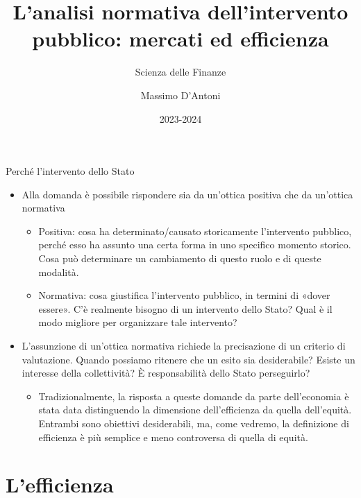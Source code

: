 \documentclass[aspectratio=149,11pt]{beamer}
\institute{Università di Siena}
\author{Massimo D'Antoni}
\date{2023-2024}
\title{L'analisi normativa dell'intervento pubblico: mercati ed efficienza}
\subtitle{Scienza delle Finanze}
\begin{document}
\maketitle

\begin{frame}{Perché l'intervento dello Stato}
\begin{itemize}
\item Alla domanda è possibile rispondere sia da un’ottica positiva che da un’ottica normativa
\begin{itemize}
\item \alert{Positiva}: cosa ha determinato/causato storicamente l’intervento pubblico, perché esso ha assunto una certa forma in uno specifico momento storico. Cosa può determinare un cambiamento di questo ruolo e di queste modalità.
\item \alert{Normativa}: cosa giustifica l’intervento pubblico, in termini di «dover essere».  C’è realmente bisogno di un intervento dello Stato? Qual è il modo migliore per organizzare tale intervento?
\end{itemize}
\item L’assunzione di un’ottica normativa richiede la precisazione di un criterio di valutazione. Quando possiamo ritenere che un esito sia desiderabile? Esiste un interesse della collettività? È responsabilità dello Stato perseguirlo?
\begin{itemize}
\item Tradizionalmente, la risposta a queste domande da parte dell’economia è stata data distinguendo la dimensione dell'\alert{efficienza} da quella dell'\alert{equità}. Entrambi sono obiettivi desiderabili, ma, come vedremo, la definizione di efficienza è più semplice e meno controversa di quella di equità.
\end{itemize}
\end{itemize}
\end{frame}

\section{L'efficienza}
\end{document}
